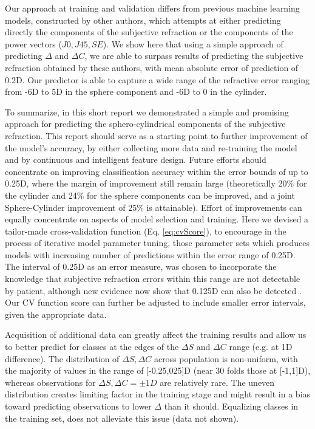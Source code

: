 \documentclass[article,twocolumn,preprint,10pt]{paper}%
\renewcommand{\(}{\left(}
\renewcommand{\)}{\right)}
\renewcommand{\[}{\left[}
\renewcommand{\]}{\right]}
\newcommand{\1}{\mbox{\boldmath$1$}}
\begin{document}
   Our approach at training and validation differs from previous machine learning models, constructed by other authors, which attempts at either predicting directly the components of the subjective refraction or the components of the power vectors ($J0,J45,SE$). We show here that using a simple approach of predicting $\Delta $ and $\Delta C$, we are able to surpass results of predicting the  subjective refraction obtained by these authors, with mean absolute error of prediction of 0.2D. Our predictor is able to capture a wide range of the refractive error ranging from -6D to 5D in the sphere component and -6D to 0 in the cylinder. 
   	
	To summarize, in this short report we demonstrated a simple and promising approach for predicting the sphero-cylindrical components of the subjective refraction. This report should serve as a starting point to further improvement of the model's accuracy, by either collecting more data and re-training the model and by continuous and intelligent feature design.  Future efforts should concentrate on improving classification accuracy within the error bounds of up to 0.25D, where the margin of improvement still remain large (theoretically 20\% for the cylinder and 24\% for the sphere components can be improved, and a joint Sphere-Cylinder improvement of 25\% is attainable).
	 Effort of improvements can equally concentrate on aspects of model selection and training. Here we devised a tailor-made cross-validation function (Eq. \ref{eq:cvScore}), to encourage in the process of iterative model parameter tuning, those parameter sets which produces models with increasing number of predictions within the error range of 0.25D. The interval of 0.25D as an error measure, was chosen to incorporate the knowledge that subjective refraction errors within this range are not detectable by patient, although new evidence now show that 0.125D can also be detected \cite{marinrefraction}. Our CV function score can further be adjusted to include smaller error intervals, given the appropriate data. 
	 
	 Acquisition of additional data can greatly affect the training results and allow us to better predict for classes at the edges of the $\Delta S$ and $\Delta C$ range (e.g. at 1D difference). The distribution of $\Delta S,\Delta C$ across population is non-uniform, with the majority of values in the range of [-0.25,025]D (near 30 folds those at [-1,1]D), whereas observations for $\Delta S, \Delta C=\pm1D$ are relatively rare. The uneven distribution creates limiting factor in the training stage and might result in a bias toward predicting observations to lower $\Delta$ than it should. Equalizing classes in the training set, does not alleviate this issue (data not shown). 
	 
\end{document}

